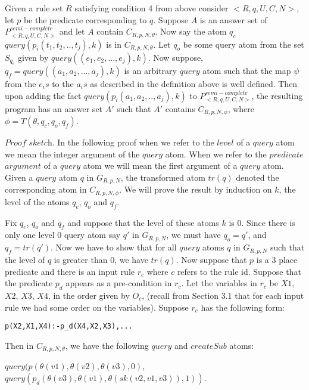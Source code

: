 \documentclass[sigconf]{acmart}
\begin{document}
\begin{theorem}\label{termsub}
Given a rule set $R$ satisfying condition 4 from above consider $<R,q,U,C,N>$, let $p$ be the predicate corresponding to $q$. Suppose $A$ is an answer set of $P^{semi-complete}_{<R,q,U,C,N>}$ and let $A$ contain $C_{R,p,N,\theta}$. Now say the atom $q_{c}$ $query(p_{i}(t_{1},t_{2},..,t_{j}),k)$ is in $C_{R,p,N,\theta}$. Let $q_{o}$ be some query atom from the set $S_{q_{c}}$ given by $query((e_{1},e_{2},...,e_{j}),k)$. Now suppose, $q_{f}= query((a_{1},a_{2},...,a_{j}),k)$ is an arbitrary $query$ atom such that the map $\psi$ from the $e_{i}s$ to the $a_{i}s$ as described in the definition above is well defined. Then upon adding the fact $query(p_{i}(a_{1},a_{2},..,a_{j}),k)$ to $P^{semi-complete}_{<R,q,U,C,N>}$, the resulting program has an answer set $A'$ such that $A'$ contains $C_{R,p,N,\phi}$, where $\phi = T(\theta, q_{c}, q_{o}, q_{f})$. 
\end{theorem}
$\textit{Proof sketch}$. In the following proof when we refer to the $level$ of a $query$ atom we mean the integer argument of the $query$ atom. When we refer to the $predicate$ $argument$ of a $query$ atom we will mean the first argument of a $query$ atom. Given a $query$ atom $q$ in $G_{R,p,N}$, the transformed atom $tr(q)$ denoted the corresponding atom in $C_{R,p,N,\phi}$. We will prove the result by induction on $k$, the level of the atoms $q_{c}$, $q_{o}$ and $q_{f}$. 

Fix $q_{c}$, $q_{o}$ and $q_{f}$ and suppose that the level of these atoms $k$ is $0$. Since there is only one level $0$ query atom say $q'$ in $G_{R,p,N}$, we must have $q_{o}=q'$, and $q_{f} = tr(q')$. Now we have to show that for all $query$ atoms $q$ in $G_{R,p,N}$ such that the level of $q$ is greater than $0$, we have $tr(q)$. Now suppose that $p$ is a 3 place predicate and there is an input rule $r_{c}$ where ${c}$ refers to the rule id. Suppose that the predicate $p_{d}$ appears as a pre-condition in $r_{c}$. Let the variables in $r_{c}$ be $X1$, $X2$, $X3$, $X4$, in the order given by $O_{c}$, (recall from Section 3.1 that for each input rule we had some order on the variables). Suppose $r_{c}$ has the following form:
\begin{verbatim}
p(X2,X1,X4):-p_d(X4,X2,X3),...    
\end{verbatim}

Then in $C_{R,p,N,\theta}$, we have the following $query$ and $createSub$ atoms:

$query(p(\theta(v1),\theta(v2),\theta(v3),0)$, $query(p_{d}(\theta(v3),\theta(v1),\theta(sk(v2,v1,v3)),1))$. 
\end{document}
